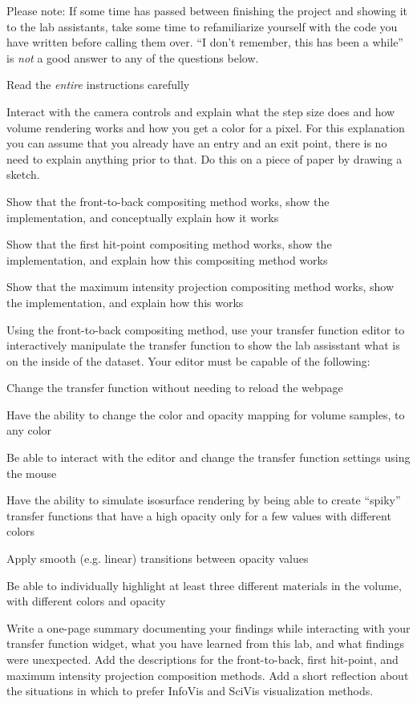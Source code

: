 \documentclass{labinstructions}
\begin{document}
Please note: If some time has passed between finishing the project and showing it to the lab assistants, take some time to refamiliarize yourself with the code you have written before calling them over.  ``I don't remember, this has been a while'' is \emph{not} a good answer to any of the questions below.
\begin{todolist}
  \item Read the \emph{entire} instructions carefully
  \item Interact with the camera controls and explain what the step size does and how volume rendering works and how you get a color for a pixel.  For this explanation you can assume that you already have an entry and an exit point, there is no need to explain anything prior to that.  Do this on a piece of paper by drawing a sketch.
  \item Show that the front-to-back compositing method works, show the implementation, and conceptually explain how it works
  \item Show that the first hit-point compositing method works, show the implementation, and explain how this compositing method works
  \item Show that the maximum intensity projection compositing method works, show the implementation, and explain how this works
  \item Using the front-to-back compositing method, use your transfer function editor to interactively manipulate the transfer function to show the lab assisstant what is on the inside of the dataset.  Your editor must be capable of the following:
  \begin{todolist}
    \item Change the transfer function without needing to reload the webpage
    \item Have the ability to change the color and opacity mapping for volume samples, to any color
    \item Be able to interact with the editor and change the transfer function settings using the mouse
    \item Have the ability to simulate isosurface rendering by being able to create ``spiky'' transfer functions that have a high opacity only for a few values with different colors
    \item Apply smooth (e.g. linear) transitions between opacity values
    \item Be able to individually highlight at least three different materials in the volume, with different colors and opacity
  \end{todolist}
  \item Write a one-page summary documenting your findings while interacting with your transfer function widget, what you have learned from this lab, and what findings were unexpected.  Add the descriptions for the front-to-back, first hit-point, and maximum intensity projection composition methods.  Add a short reflection about the situations in which to prefer InfoVis and SciVis visualization methods. 
\end{todolist}
\end{document}

